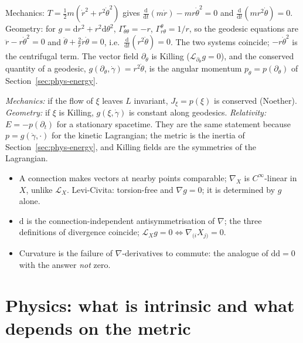 \documentclass[11pt,a4paper]{article}
\numberwithin{equation}{section}
\theoremstyle{definition}
\theoremstyle{plain}
\newcommand{\dd}{\mathrm{d}}
\newcommand{\Lie}{\mathcal{L}}
\begin{document}
\begin{example}\label{ex:polarfree}
Mechanics: $T=\frac12m(\dot r^2+r^2\dot\theta^2)$ gives $\frac{\dd}{\dd t}(m\dot r)-mr\dot\theta^2=0$ and $\frac{\dd}{\dd t}(mr^2\dot\theta)=0$.
Geometry: for $g=\dd r^2+r^2\dd\theta^2$, $\Gamma^r_{\theta\theta}=-r$, $\Gamma^\theta_{r\theta}=1/r$, so the geodesic equations are $\ddot r-r\dot\theta^2=0$ and $\ddot\theta+\frac2r\dot r\dot\theta=0$, i.e.\ $\frac{\dd}{\dd t}(r^2\dot\theta)=0$.
The two systems coincide; $-r\dot\theta^2$ is the centrifugal term. The vector field $\partial_\theta$ is Killing ($\Lie_{\partial_\theta}g=0$), and the conserved quantity of a geodesic, $g(\partial_\theta,\dot\gamma)=r^2\dot\theta$, is the angular momentum $p_\theta=p(\partial_\theta)$ of Section~\ref{sec:phys-energy}.
\end{example}

\begin{keyidea}
\emph{Mechanics:} if the flow of $\xi$ leaves $L$ invariant, $J_\xi=p(\xi)$ is conserved (Noether). \emph{Geometry:} if $\xi$ is Killing, $g(\xi,\dot\gamma)$ is constant along geodesics. \emph{Relativity:} $E=-p(\partial_t)$ for a stationary spacetime.
They are the same statement because $p=g(\dot\gamma,\cdot)$ for the kinetic Lagrangian; the metric is the inertia of Section~\ref{sec:phys-energy}, and Killing fields are the symmetries of the Lagrangian.
\end{keyidea}

\begin{keypoints}[Part IV]
\begin{itemize}
\item A connection makes vectors at nearby points comparable; $\nabla_X$ is $C^\infty$-linear in $X$, unlike $\Lie_X$. Levi-Civita: torsion-free and $\nabla g=0$; it is determined by $g$ alone.
\item $\dd$ is the connection-independent antisymmetrisation of $\nabla$; the three definitions of divergence coincide; $\Lie_Xg=0\iff\nabla_{(i}X_{j)}=0$.
\item Curvature is the failure of $\nabla$-derivatives to commute: the analogue of $\dd\dd=0$ with the answer \emph{not} zero.
\end{itemize}
\end{keypoints}


\clearpage
\part{Physics: what is intrinsic and what depends on the metric}\label{part:physics}
\end{document}
